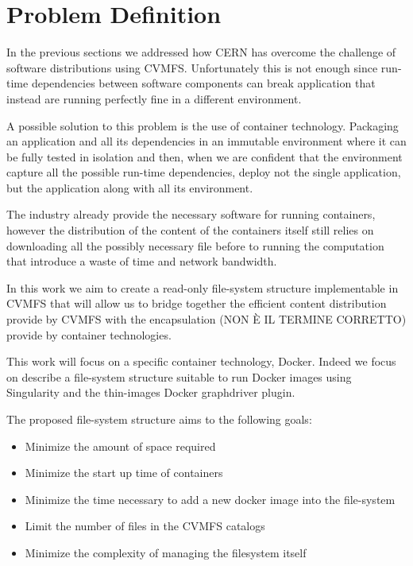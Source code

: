 \chapter{Problem Definition}\label{ch:ProblemDefinition}

In the previous sections we addressed how CERN has overcome the challenge of
software distributions using CVMFS. Unfortunately this is not enough since
run-time dependencies between software components can break application that
instead are running perfectly fine in a different environment.

A possible solution to this problem is the use of container technology.
Packaging an application and all its dependencies in an immutable environment
where it can be fully tested in isolation and then, when we are confident that
the environment capture all the possible run-time dependencies, deploy not the
single application, but the application along with all its environment.

The industry already provide the necessary software for running containers,
however the distribution of the content of the containers itself still relies
on downloading all the possibly necessary file before to running the
computation that introduce a waste of time and network bandwidth. 

In this work we aim to create a read-only file-system structure implementable
in CVMFS that will allow us to bridge together the efficient content
distribution provide by CVMFS with the encapsulation (NON È IL TERMINE
CORRETTO) provide by container technologies.

This work will focus on a specific container technology, Docker. Indeed we
focus on describe a file-system structure suitable to run Docker images using
Singularity and the thin-images Docker graphdriver plugin.

The proposed file-system structure aims to the following goals:
\begin{itemize}
\item Minimize the amount of space required
\item Minimize the start up time of containers
\item Minimize the time necessary to add a new docker image into the file-system
\item Limit the number of files in the CVMFS catalogs 
\item Minimize the complexity of managing the filesystem itself
\end{itemize}

